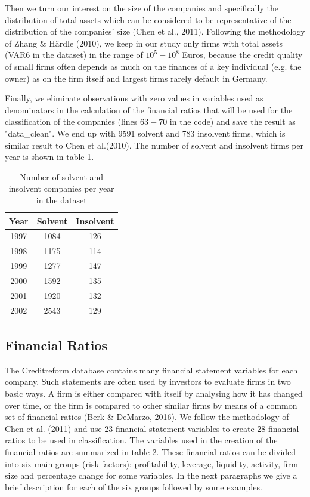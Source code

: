 \documentclass{article}
\begin{document}
Then we turn our interest on the size of the companies and specifically the distribution of total assets which can be considered to be representative of the distribution of the companies' size (Chen et al., 2011). Following the methodology of Zhang \& H{\"a}rdle (2010), we keep in our study only firms with total assets (VAR6 in the dataset) in the range of $10^5 - 10^8$ Euros, because the credit quality of small firms often depends as much on the finances of a key individual (e.g. the owner) as on the firm itself and largest firms rarely default in Germany.

Finally, we eliminate observations with zero values in variables used as denominators in the calculation of the financial ratios that will be used for the classification of the companies (lines $63-70$ in the code) and save the result as "data\_clean". We end up with 9591 solvent and 783 insolvent firms, which is similar result to Chen et al.(2010). The number of solvent and insolvent firms per year is shown in table 1.
\vskip 0.2in
\begin{table}
\caption{Number of solvent and insolvent companies per year in the dataset}
\begin{center}
\begin{tabular}{ccc} 
\hline\hline
Year & Solvent & Insolvent\\ 
\hline
1997 & 1084 & 126 \\
1998 & 1175 & 114 \\
1999 & 1277 & 147 \\
2000 & 1592 & 135 \\
2001 & 1920 & 132 \\
2002 & 2543 & 129 \\
\hline\hline
\end{tabular}
\end{center}
\end{table}

\subsection{Financial Ratios}

The Creditreform database contains many financial statement variables for each company. Such statements are often used by investors to evaluate firms in two basic ways. A firm is either compared with itself by analysing how it has changed over time, or the firm is compared to other similar firms by means of a common set of financial ratios (Berk \& DeMarzo, 2016).  We follow the methodology of Chen et al. (2011) and use 23 financial statement variables to create 28 financial ratios to be used in classification. The variables used in the creation of the financial ratios are summarized in table 2. These financial ratios can be divided into six main groups (risk factors): profitability, leverage, liquidity, activity, firm size and percentage change for some variables. In the next paragraphs we give a brief description for each of the six groups followed by some examples.
\end{document}
